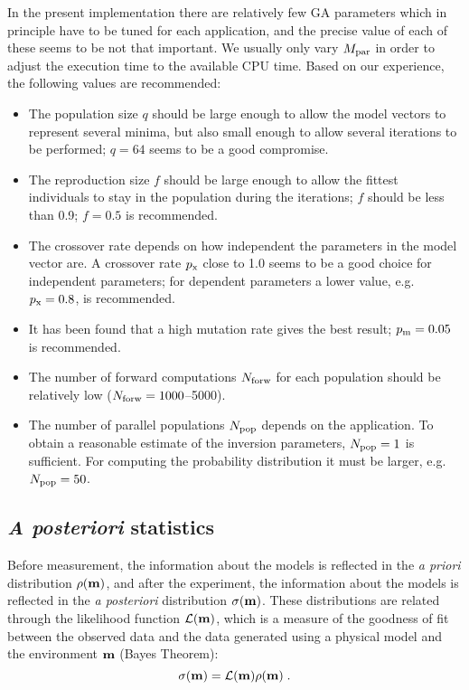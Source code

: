 \documentclass{saclantc}
\begin{document}
In the present implementation there are relatively few GA parameters
which in principle have to be tuned for each application, and the
precise value of each of these seems to be not that important. We
usually only vary $M_{\rm par} $ in order to adjust the execution time
to the available CPU time. Based on our experience, the
following values are recommended:
\begin{itemize}
\item The population size $ q$ should be large enough to allow
the model vectors to represent several minima, but also small
enough  to allow several iterations to be performed; $q=64 $ seems to be a
good compromise.
\item The reproduction size $f$ should be large enough to allow the
fittest individuals to stay in the population during the iterations; $f$
should be less than 0.9;  $f=0.5$ is recommended.
\item The crossover rate depends on how independent the parameters in
the model vector are. A crossover rate $ p_{\rm x}$ close to 1.0 seems
to be a good choice for independent parameters; for dependent
parameters a lower value, e.g. $ p_{\rm x}=0.8$, is recommended.
\item It has been found that a high mutation rate gives the best
result; $ p_{\rm m}=0.05$ is recommended.
\item The number of forward computations $N_{\rm forw}$ for each population should be
relatively low ($N_{\rm forw}=1000$--5000).
\item The number of parallel populations $N_{\rm pop}$ depends on the
application.  To obtain a reasonable estimate of the inversion
parameters, $N_{\rm pop} = 1$ is sufficient. For computing the
probability distribution it must be larger, e.g.\ $N_{\rm pop} = 50$.
\end{itemize}


\subsection{{\it A posteriori} statistics}
\label{se:post}

Before  measurement, the information about the models is reflected
in the {\it a priori} distribution $ \rho({\bf m})$, and after the experiment,
the information about the models is reflected in the {\it a posteriori}
distribution $\sigma({\bf m})$.  These distributions are related
through the likelihood function ${\cal L}({\bf m})$, which is a measure of the
goodness of fit between the observed data and the data generated using
a physical model and the environment $\bf m$ (Bayes Theorem):
\begin{equation} 
   \sigma({\bf m}) ={\cal L}({\bf m}) \rho({\bf m}) \; .  \label{eq:bayes} 
\end{equation} 
\end{document}
